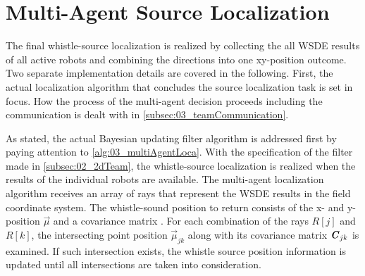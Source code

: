 \section{Multi-Agent Source Localization}
\label{sec:03_multiAgentLoca}

The final whistle-source localization is realized by collecting the
all \ac{WSDE} results of all active robots and combining the directions
into one xy-position outcome.
Two separate implementation details are covered in the following.
First, the actual localization algorithm that concludes the source localization
task is set in focus.
How the process of the multi-agent decision proceeds including the communication
is dealt with in \cref{subsec:03_teamCommunication}.

As stated, the actual Bayesian updating filter algorithm is addressed first
by paying attention to \cref{alg:03_multiAgentLoca}.
With the specification of the filter made in \cref{subsec:02_2dTeam}, the
whistle-source localization is realized when the results of the individual robots
are available.
The multi-agent localization algorithm receives an array of rays that represent
the \ac{WSDE} results in the field coordinate system.
The whistle-sound position to return consists of the x- and y-position $\vec{\mu}$ and
a covariance matrix .
For each combination of the rays $R[j]$ and $R[k]$, the intersecting point position
$\vec{\mu}_{jk}$ along with its covariance matrix $\textbf{\textit{C}}_{jk}$ is examined.
If such intersection exists, the whistle source position information is updated until all intersections are taken into consideration.

